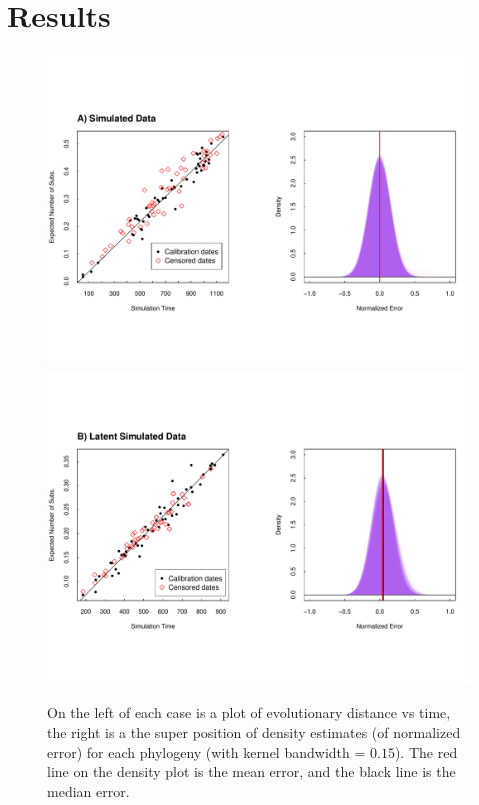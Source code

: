 \section{Results} \label{sec:results}

\begin{figure} \label{fig:results1}
	\centering
	\includegraphics[trim=0cm 0cm 0cm 6cm, clip=true, scale=0.425]{figures/simulated.pdf} \\
	\includegraphics[trim=0cm 0cm 0cm 7cm, clip=true,scale=0.425]{figures/simulated_latent.pdf}\\
	\caption[Simulated Data]{On the left of each case is a plot of evolutionary distance vs time, the right is a the super position of density estimates (of normalized error) for each phylogeny (with kernel bandwidth = $0.15$). The red line on the density plot is the mean error, and the black line is the median error. }
\end{figure}

